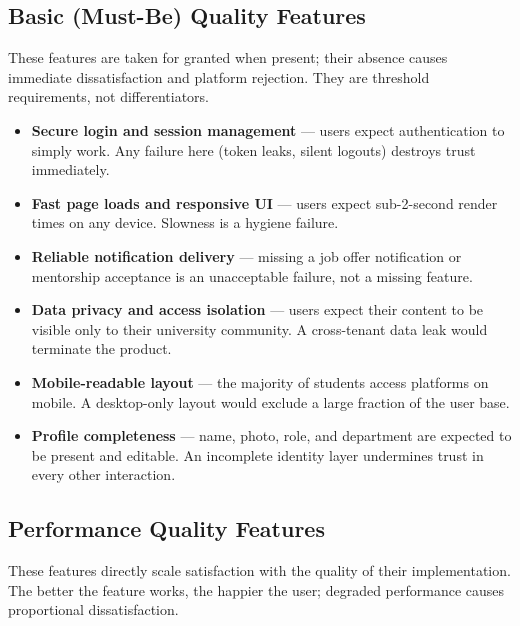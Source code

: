 \documentclass[12pt, a4paper]{article}
\begin{document}
\subsection{Basic (Must-Be) Quality Features}

These features are taken for granted when present; their absence causes immediate
dissatisfaction and platform rejection. They are threshold requirements, not
differentiators.

\begin{itemize}
    \item \textbf{Secure login and session management} --- users expect authentication
    to simply work. Any failure here (token leaks, silent logouts) destroys trust
    immediately.
    \item \textbf{Fast page loads and responsive UI} --- users expect sub-2-second
    render times on any device. Slowness is a hygiene failure.
    \item \textbf{Reliable notification delivery} --- missing a job offer notification
    or mentorship acceptance is an unacceptable failure, not a missing feature.
    \item \textbf{Data privacy and access isolation} --- users expect their content to
    be visible only to their university community. A cross-tenant data leak would
    terminate the product.
    \item \textbf{Mobile-readable layout} --- the majority of students access platforms
    on mobile. A desktop-only layout would exclude a large fraction of the user base.
    \item \textbf{Profile completeness} --- name, photo, role, and department are
    expected to be present and editable. An incomplete identity layer undermines trust
    in every other interaction.
\end{itemize}

\subsection{Performance Quality Features}

These features directly scale satisfaction with the quality of their implementation.
The better the feature works, the happier the user; degraded performance causes
proportional dissatisfaction.
\end{document}
